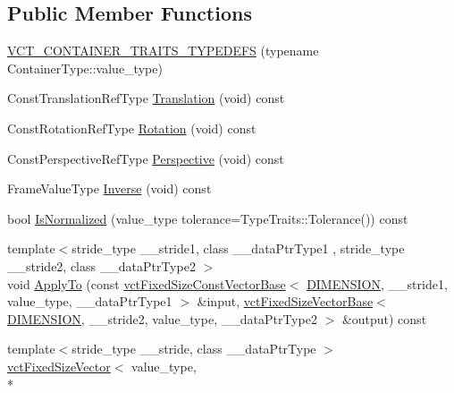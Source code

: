 \subsection*{Public Member Functions}
\begin{DoxyCompactItemize}
\item 
\hyperlink{classvct_frame4x4_const_base_aef998797a8d07436b67568f729539103}{V\-C\-T\-\_\-\-C\-O\-N\-T\-A\-I\-N\-E\-R\-\_\-\-T\-R\-A\-I\-T\-S\-\_\-\-T\-Y\-P\-E\-D\-E\-F\-S} (typename Container\-Type\-::value\-\_\-type)
\item 
Const\-Translation\-Ref\-Type \hyperlink{classvct_frame4x4_const_base_a81571b849bb769466e39dddd510b2628}{Translation} (void) const 
\item 
Const\-Rotation\-Ref\-Type \hyperlink{classvct_frame4x4_const_base_aae75fc595135c7d3aa8945144cedd91e}{Rotation} (void) const 
\item 
Const\-Perspective\-Ref\-Type \hyperlink{classvct_frame4x4_const_base_a2b3da139fde5f2cfbc4ae4ddbdefcebc}{Perspective} (void) const 
\item 
Frame\-Value\-Type \hyperlink{classvct_frame4x4_const_base_ad4b9f70a24ed1a5e693a66bd149df0da}{Inverse} (void) const 
\item 
bool \hyperlink{classvct_frame4x4_const_base_afff3495048bde408d23103a78c551d6b}{Is\-Normalized} (value\-\_\-type tolerance=Type\-Traits\-::\-Tolerance()) const 
\item 
{\footnotesize template$<$stride\-\_\-type \-\_\-\-\_\-stride1, class \-\_\-\-\_\-data\-Ptr\-Type1 , stride\-\_\-type \-\_\-\-\_\-stride2, class \-\_\-\-\_\-data\-Ptr\-Type2 $>$ }\\void \hyperlink{classvct_frame4x4_const_base_a146079e4a58d048afe35208ed7f85273}{Apply\-To} (const \hyperlink{classvct_fixed_size_const_vector_base}{vct\-Fixed\-Size\-Const\-Vector\-Base}$<$ \hyperlink{classvct_frame4x4_const_base_aa9000d4539e9ab27b091692d4bd0d986a97d7212e6c46dc9acbbd11bbc573d9a0}{D\-I\-M\-E\-N\-S\-I\-O\-N}, \-\_\-\-\_\-stride1, value\-\_\-type, \-\_\-\-\_\-data\-Ptr\-Type1 $>$ \&input, \hyperlink{classvct_fixed_size_vector_base}{vct\-Fixed\-Size\-Vector\-Base}$<$ \hyperlink{classvct_frame4x4_const_base_aa9000d4539e9ab27b091692d4bd0d986a97d7212e6c46dc9acbbd11bbc573d9a0}{D\-I\-M\-E\-N\-S\-I\-O\-N}, \-\_\-\-\_\-stride2, value\-\_\-type, \-\_\-\-\_\-data\-Ptr\-Type2 $>$ \&output) const 
\item 
{\footnotesize template$<$stride\-\_\-type \-\_\-\-\_\-stride, class \-\_\-\-\_\-data\-Ptr\-Type $>$ }\\\hyperlink{classvct_fixed_size_vector}{vct\-Fixed\-Size\-Vector}$<$ value\-\_\-type, \\*

\end{DoxyCompactItemize}
